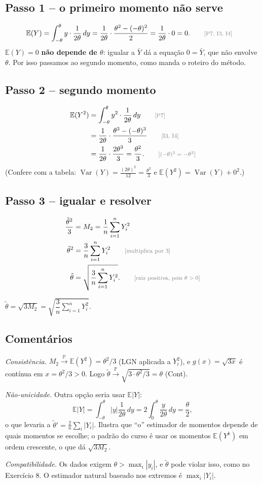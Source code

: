 \documentclass[11pt,a4paper]{article}
\newcommand{\E}{\mathbb{E}}
\newcommand{\Var}{\operatorname{Var}}
\newcommand{\Prob}{\mathbb{P}}
\newcommand{\convP}{\xrightarrow{\;\Prob\;}}
\newcommand{\bY}{\bar{Y}}
\newcommand{\just}[1]{\tag*{\footnotesize\textcolor{gray}{[#1]}}}
\begin{document}
\subsection*{Passo 1 -- o primeiro momento não serve}
\begin{align*}
\E(Y)&=\int_{-\theta}^{\theta}y\cdot\frac{1}{2\theta}\,dy=\frac1{2\theta}\cdot\frac{\theta^2-(-\theta)^2}{2}=\frac{1}{2\theta}\cdot0=0 . \just{P7, I3, I4}
\end{align*}
$\E(Y)=0$ \textbf{não depende de $\theta$}: igualar a $\bY$ dá a equação $0=\bY$, que não envolve $\theta$. Por isso passamos ao segundo momento, como manda o roteiro do método.

\subsection*{Passo 2 -- segundo momento}
\begin{align*}
\E(Y^2)&=\int_{-\theta}^{\theta}y^2\cdot\frac{1}{2\theta}\,dy \just{P7}\\
&=\frac1{2\theta}\cdot\frac{\theta^3-(-\theta)^3}{3} \just{I3, I4}\\
&=\frac1{2\theta}\cdot\frac{2\theta^3}{3}=\frac{\theta^2}{3}. \just{$(-\theta)^3=-\theta^3$}
\end{align*}
(Confere com a tabela: $\Var(Y)=\frac{(2\theta)^2}{12}=\frac{\theta^2}{3}$ e $\E(Y^2)=\Var(Y)+0^2$.)

\subsection*{Passo 3 -- igualar e resolver}
\begin{align*}
\frac{\tilde\theta^2}{3}&=M_2=\frac1n\sum_{i=1}^nY_i^2\\
\tilde\theta^2&=\frac3n\sum_{i=1}^nY_i^2 \just{multiplica por 3}\\
\tilde\theta&=\sqrt{\frac3n\sum_{i=1}^nY_i^2}. \just{raiz positiva, pois $\theta>0$}
\end{align*}

\begin{resposta}
$\tilde\theta=\sqrt{3M_2}=\sqrt{\dfrac{3}{n}\displaystyle\sum_{i=1}^nY_i^2}$.
\end{resposta}

\subsection*{Comentários}
\textit{Consistência.} $M_2\convP\E(Y^2)=\theta^2/3$ (LGN aplicada a $Y_i^2$), e $g(x)=\sqrt{3x}$ é contínua em $x=\theta^2/3>0$. Logo $\tilde\theta\convP\sqrt{3\cdot\theta^2/3}=\theta$ (Cont).

\textit{Não-unicidade.} Outra opção seria usar $\E|Y|$:
\[
\E|Y|=\int_{-\theta}^{\theta}|y|\frac{1}{2\theta}\,dy=2\int_0^\theta\frac{y}{2\theta}\,dy=\frac{\theta}{2},
\]
o que levaria a $\tilde\theta'=\frac2n\sum_i|Y_i|$. Ilustra que ``o'' estimador de momentos depende de quais momentos se escolhe; o padrão do curso é usar os momentos $\E(Y^k)$ em ordem crescente, o que dá $\sqrt{3M_2}$.

\textit{Compatibilidade.} Os dados exigem $\theta>\max_i|y_i|$, e $\tilde\theta$ pode violar isso, como no Exercício 8. O estimador natural baseado nos extremos é $\max_i|Y_i|$.
\end{document}
